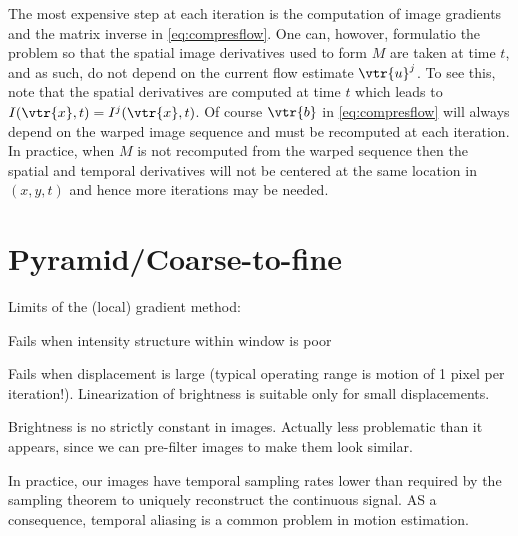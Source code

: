 \begin{compactdesc}
The most expensive step at each iteration is the computation of image gradients and the matrix inverse in \ref{eq:compresflow}. One can, howover, formulatio the problem so that the spatial image derivatives used to form $M$ are taken at time $t$, and as such, do not depend on the current flow estimate $\vtr{u}^j$. To see this, note that the spatial derivatives are computed at time $t$ which leads to $I(\vtr{x},t)=I^j(\vtr{x},t)$. Of course $\vtr{b}$ in \ref{eq:compresflow} will always depend on the warped image sequence and must be recomputed at each iteration. In practice, when $M$ is not recomputed from the warped sequence then the spatial and temporal derivatives will not be centered at the same location in $(x,y,t)$ and hence more iterations may be needed.
\section{Pyramid/Coarse-to-fine}
Limits of the (local) gradient method:
\begin{enumerate*}[label=\protect\circled{\arabic*},itemjoin=]
	\item Fails when intensity structure within window is poor\\
	\item Fails when displacement is large (typical operating range is motion of 1 pixel per iteration!). Linearization of brightness is suitable only for small displacements. \\
	\item Brightness is no strictly constant in images. Actually less problematic than it appears, since we can pre-filter images to make them look similar.\\
\end{enumerate*}

In practice, our images have temporal sampling rates lower than required by the sampling theorem to uniquely reconstruct the continuous signal. AS a consequence, temporal aliasing is a common problem in motion estimation.


\end{compactdesc}
